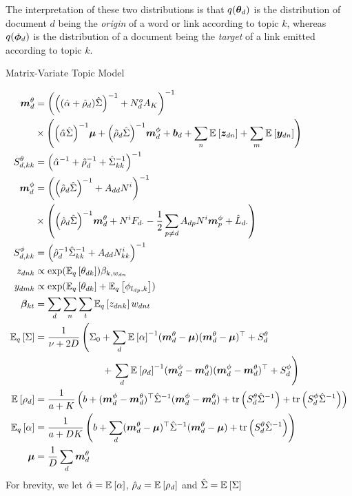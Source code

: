 The interpretation of these two distributions is that $q(\thd)$ is the distribution of document $d$ being the \emph{origin} of a word or link according to topic $k$, whereas $q(\vv{\phi}_d)$ is the distribution of a document being the \emph{target} of a link emitted according to topic $k$.

\begin{algorithm}
\caption{Matrix-Variate Topic Model}
\label{alg:sra_generic}

    \begin{align*}
        \mtd &= 
            \invb{ \invb{(\hat{\alpha} + \hat{\rho}_d)\hat{\Sigma}} + N^o_d A_K } \\
            & \times \left(
                \invb{\hat{\alpha} \hat{\Sigma}}\vv{\mu}
                + \invb{\hat{\rho}_d \hat{\Sigma}} \mpd + \vv{b}_d 
                + \sum_n \ex{\vv{z}_{dn}}{} 
                + \sum_m \ex{\vv{y}_{dn}}{}
            \right)\\
         S^\theta_{d,kk} &= \invb{\inv{\hat{\alpha}} + \inv{\hat{\rho}_d} + \inv{\hat{\Sigma}}_{kk}} \\
         \mpd & = \invb{\invb{\hat{\rho}_d \hat{\Sigma}} + A_{dd}N^i} \\
             & \times \left(
                 \invb{\hat{\rho}_d \hat{\Sigma}}\mtd 
                 + N^i F_{d\cdot} 
                 -\half \sum_{p \neq d} A_{dp} N^i \vv{m}^\phi_p 
                 + \hat{L}_{d\cdot}
             \right) \\
        S^\phi_{d,kk} & = \invb{ \inv{\hat{\rho}_d} \inv{\hat{\Sigma}_{kk}} + A_{dd}N^i_{kk} } \\
        z_{dnk} & \propto \exp(\ex{\theta_{dk}}{q})\beta_{k,w_{dn}} \\
        y_{dmk} & \propto \exp(\ex{\theta_{dk}}{q} + \ex{\phi_{l_{dp},k}}{q}) \\
        \vv{\beta}_{kt} & = \sum_d \sum_n \sum_t \ex{z_{dnk}}{q} w_{dnt} \\
        \ex{\Sigma}{q} & =  \oneover{\nu + 2D} \left(\Sigma_0
             + \sum_d \inv{\ex{\alpha}{}} (\mtd - \vv{\mu})(\mtd - \vv{\mu})\T + \std  \right .\\
            & \qquad\qquad\qquad\quad+ \left. \sum_d \inv{\ex{\rho_d}{}} (\mpd - \mtd)(\mpd - \mtd)\T + \spd \right)  \\  \ex{\rho_d}{} & = \oneover{a + K} \left(b + (\mpd - \mtd)\T \inv{\hat{\Sigma}} (\mpd - \mtd) + \Tr{\std \inv{\hat{\Sigma}}} + \Tr{\spd \inv{\hat{\Sigma}}} \right) \\
        \ex{\alpha}{q} & = \oneover{a + DK} \left(b + \sum_d (\mtd - \vv{\mu})\T\inv{\hat{\Sigma}}(\mtd - \vv{\mu}) + \Tr{\std \inv{\hat{\Sigma}}} \right) \\
        \vv{\mu} &= \oneover{D} \sum_d \mtd
    \end{align*}
    For brevity, we let $\hat{\alpha} = \ex{\alpha}{}$, $\hat{\rho}_d = \ex{\rho_d}{}$ and $\hat{\Sigma} = \ex{\Sigma}{}$
\end{algorithm}

